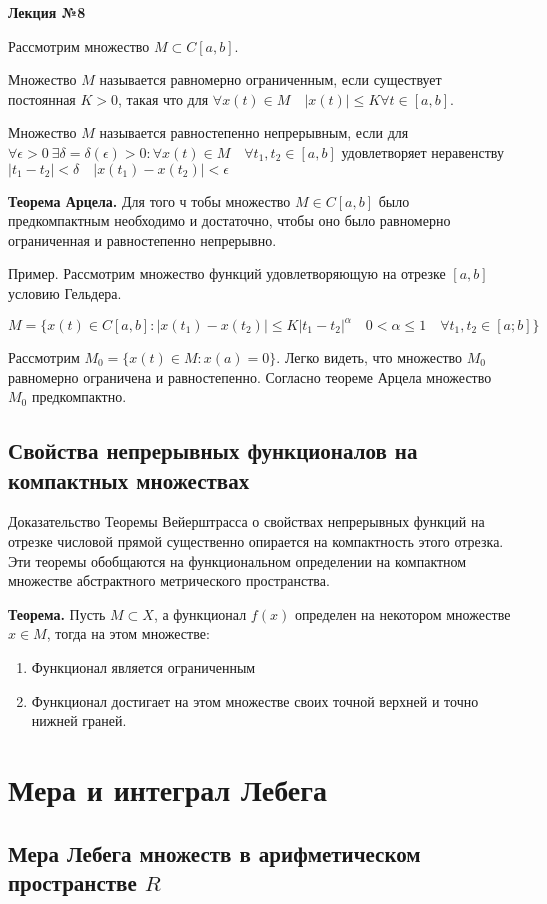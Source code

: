 \documentclass[14pt,a4paper]{extarticle}
\theoremstyle{definition}
\theoremstyle{remark}
\renewcommand{\[}{\begin{dmath*}[compact]}
\renewcommand{\]}{\end{dmath*}}
\newcommand{\be}{\begin{enumerate}}
\newcommand{\ee}{\end{enumerate}}
\newcommand{\tth}[1][]{\textbf{Теорема#1.}}
\begin{document}
\textbf{Лекция №8}

Рассмотрим множество $M\subset C[a,b]$.

Множество $M$ называется равномерно ограниченным, если существует постоянная $K>0$, такая что для $\forall x(t)\in M \quad |x(t)|\leq K \forall t \in [a,b]$.

Множество $M$ называется равностепенно непрерывным, если для $\forall \epsilon > 0 \ \exists \delta = \delta(\epsilon)>0:\forall x(t)\in M\quad \forall t_1,t_2\in [a,b]$ удовлетворяет неравенству $|t_1-t_2|<\delta \quad |x(t_1)-x(t_2)|<\epsilon$

\tth[ Арцела] Для того ч тобы множество $M\in C[a,b]$ было предкомпактным необходимо и достаточно, чтобы оно было равномерно ограниченная и равностепенно непрерывно.

Пример. Рассмотрим множество функций удовлетворяющую на отрезке $[a,b]$ условию Гельдера.

\[
M=\{x(t)\in C[a,b]: |x(t_1)-x(t_2)|\leq K|t_1-t_2|^\alpha \quad 0 < \alpha \leq 1 \quad \forall t_1,t_2 \in [a;b]\}
\]

Рассмотрим $M_0=\{x(t)\in M:x(a)=0\}$. Легко видеть, что множество $M_0$ равномерно ограничена и равностепенно. Согласно теореме Арцела множество $M_0$ предкомпактно.

\subsection{Свойства непрерывных функционалов на компактных множествах}

Доказательство Теоремы Вейерштрасса о свойствах непрерывных функций на отрезке числовой прямой существенно опирается на компактность этого отрезка. Эти теоремы обобщаются на функциональном определении на компактном множестве абстрактного метрического пространства.

\tth[] Пусть $M\subset X$, а функционал $f(x)$ определен на некотором множестве $x \in M$, тогда на этом множестве:

\be
  \item Функционал является ограниченным
  \item Функционал достигает на этом множестве своих точной верхней и точно нижней граней.
\ee

\section{Мера и интеграл Лебега}

\subsection{Мера Лебега множеств в арифметическом пространстве \texorpdfstring{$R$}{Lg}}
\end{document}
